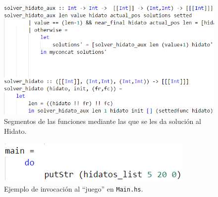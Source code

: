 \documentclass{llncs}
\begin{document}
\begin{figure}
\begin{center}
\includegraphics[width= 1\columnwidth]{figuras/solver}
\end{center}
\caption{Segmentos de las funciones mediante las que se les da soluci\'on al Hidato.}
\label{solver}
\end{figure}

\begin{figure}
\begin{center}
\includegraphics[width= .5\columnwidth]{figuras/main}
\end{center}
\caption{Ejemplo de invocaci\'on al ``juego'' en \texttt{Main.hs}.}
\label{main}
\end{figure}
\end{document}
